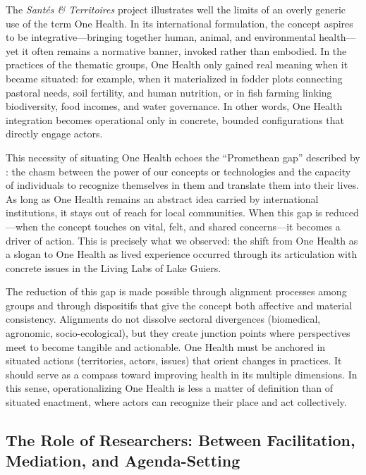 \documentclass{article}
\begin{document}
The \textit{Santés \& Territoires} project illustrates well the limits of an overly generic use of the term One Health. In its international formulation, the concept aspires to be integrative—bringing together human, animal, and environmental health—yet it often remains a normative banner, invoked rather than embodied. In the practices of the thematic groups, One Health only gained real meaning when it became situated: for example, when it materialized in fodder plots connecting pastoral needs, soil fertility, and human nutrition, or in fish farming linking biodiversity, food incomes, and water governance. In other words, One Health integration becomes operational only in concrete, bounded configurations that directly engage actors.  

This necessity of situating One Health echoes the “Promethean gap” described by \textcite{anders_obsolescence_1956}: the chasm between the power of our concepts or technologies and the capacity of individuals to recognize themselves in them and translate them into their lives. As long as One Health remains an abstract idea carried by international institutions, it stays out of reach for local communities. When this gap is reduced—when the concept touches on vital, felt, and shared concerns—it becomes a driver of action. This is precisely what we observed: the shift from One Health as a slogan to One Health as lived experience occurred through its articulation with concrete issues in the Living Labs of Lake Guiers.  

The reduction of this gap is made possible through alignment processes among groups and through dispositifs that give the concept both affective and material consistency. Alignments do not dissolve sectoral divergences (biomedical, agronomic, socio-ecological), but they create junction points where perspectives meet to become tangible and actionable. One Health must be anchored in situated actions (territories, actors, issues) that orient changes in practices. It should serve as a compass toward improving health in its multiple dimensions. In this sense, operationalizing One Health is less a matter of definition than of situated enactment, where actors can recognize their place and act collectively.  

\subsection{The Role of Researchers: Between Facilitation, Mediation, and Agenda-Setting}
\end{document}
